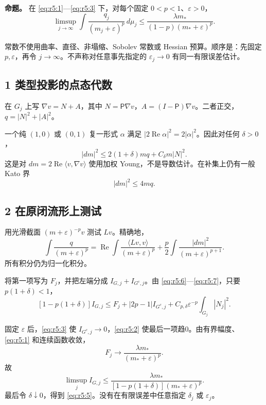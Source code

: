 \documentclass[UTF8,11pt,fontset=none]{ctexart}
\begin{document}
\textbf{命题。} 在 \eqref{eq:r5:1}---\eqref{eq:r5:3} 下，对每个固定 \(0<p<1\)、\(\varepsilon>0\)， \[
 \boxed{
 \limsup_{j\to\infty}\int
 \frac{q_j}{(m_j+\varepsilon)^p}\,d\mu_j
 \le\frac{\lambda m_*}{(1-p)(m_*+\varepsilon)^p}.
 }
\tag{5.5}\label{eq:r5:5}
\]

常数不使用曲率、直径、非塌缩、Sobolev 常数或 Hessian 预算。顺序是：先固定 \(p,\varepsilon\)，再令 \(j\to\infty\)。不声称对任意事先指定的 \(\varepsilon_j\to0\) 有同一有限误差估计。

\subsection{1 类型投影的点态代数}\label{ch5:ux7c7bux578bux6295ux5f71ux7684ux70b9ux6001ux4ee3ux6570}

在 \(G_j\) 上写 \(\nabla v=N+A\)，其中 \(N=\mathsf P\nabla v\)，\(A=(I-\mathsf P)\nabla v\)。二者正交，\(q=|N|^2+|A|^2\)。

一个纯 \((1,0)\) 或 \((0,1)\) 复一形式 \(\alpha\) 满足 \(|2\operatorname{Re}\alpha|^2=2|\alpha|^2\)。因此对任何 \(\delta>0\)， \[
 |dm|^2
 \le 2(1+\delta)m q+C_\delta m|N|^2.
\tag{5.6}\label{eq:r5:6}
\] 这是对 \(dm=2\operatorname{Re}\langle v,\nabla v\rangle\) 使用加权 Young，不是导数估计。在补集上仍有一般 Kato 界 \[
 |dm|^2\le4mq.
\tag{5.7}\label{eq:r5:7}
\]

\subsection{2 在原闭流形上测试}\label{ch5:ux5728ux539fux95edux6d41ux5f62ux4e0aux6d4bux8bd5}

用光滑截面 \((m+\varepsilon)^{-p}v\) 测试 \(Lv\)。精确地， \[
 \int\frac q{(m+\varepsilon)^p}
 =\operatorname{Re}\int\frac{\langle Lv,v\rangle}{(m+\varepsilon)^p}
 +\frac p2\int\frac{|dm|^2}{(m+\varepsilon)^{p+1}}.
\tag{5.8}\label{eq:r5:8}
\] 所有积分仍为归一化积分。

将第一项写为 \(F_j\)，并把左端分成 \(I_{G,j}+I_{G^c,j}\)。由 \eqref{eq:r5:6}---\eqref{eq:r5:7}，只要 \(p(1+\delta)<1\)， \[
 [1-p(1+\delta)]I_{G,j}
 \le F_j+|2p-1|I_{G^c,j}
   +C_{p,\delta}\varepsilon^{-p}\int_{G_j}|N_j|^2.
\tag{5.9}\label{eq:r5:9}
\]

固定 \(\varepsilon\) 后，\eqref{eq:r5:3} 使 \(I_{G^c,j}\to0\)，\eqref{eq:r5:2} 使最后一项趋0。由有界幅度、\eqref{eq:r5:1} 和连续函数收敛， \[
 F_j\longrightarrow\frac{\lambda m_*}{(m_*+\varepsilon)^p}.
\] 故 \[
 \limsup_j I_{G,j}\le
 \frac{\lambda m_*}
 {[1-p(1+\delta)](m_*+\varepsilon)^p}.
\] 最后令 \(\delta\downarrow0\)，得到 \eqref{eq:r5:5}。没有在有限误差中任意指定 \(\delta_j\) 或 \(\varepsilon_j\)。
\end{document}
